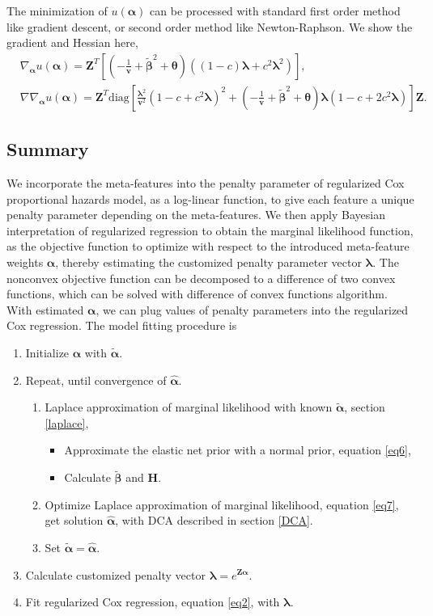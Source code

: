 \documentclass[12pt]{article}
\begin{document}
The minimization of $u(\bm{\alpha})$ can be processed with standard first order method like gradient descent, or second order method like Newton-Raphson. We show the gradient and Hessian here,
\begin{align*}
    &\nabla_{\bm{\alpha}} u(\bm{\alpha}) = \bm{Z}^T\left[(-\frac{1}{\bm{v}}+\widetilde{\bm{\beta}}^2+\bm{\theta})((1-c)\bm{\lambda}+c^2\bm{\lambda}^2)\right],\\
    &\nabla\nabla_{\bm{\alpha}} u(\bm{\alpha}) = \bm{Z}^T \text{diag}\left[\frac{\bm{\lambda}^2}{\bm{v}^2}(1-c+c^2\bm{\lambda})^2+(-\frac{1}{\bm{v}}+\widetilde{\bm{\beta}}^2+\bm{\theta})\bm{\lambda}(1-c+2c^2\bm{\lambda})\right]\bm{Z}.
\end{align*}

\subsection{Summary}
We incorporate the meta-features into the penalty parameter of regularized Cox proportional hazards model, as a log-linear function, to give each feature a unique penalty parameter depending on the meta-features. We then apply Bayesian interpretation of regularized regression to obtain the marginal likelihood function, as the objective function to optimize with respect to the introduced meta-feature weights $\bm{\alpha}$, thereby estimating the customized penalty parameter vector $\bm{\lambda}$. The nonconvex objective function can be decomposed to a difference of two convex functions, which can be solved with difference of convex functions algorithm. With estimated $\bm{\alpha}$, we can plug values of penalty parameters into the regularized Cox regression. The model fitting procedure is
\begin{enumerate}
    \item Initialize $\bm{\alpha}$ with $\widetilde{\bm{\alpha}}$.
    \item Repeat, until convergence of $\hat{\bm{\alpha}}$.
    \begin{enumerate}
        \item Laplace approximation of marginal likelihood with known $\widetilde{\bm{\alpha}}$, section \ref{laplace},
        \begin{itemize}
            \item Approximate the elastic net prior with a normal prior, equation \eqref{eq6},
            \item Calculate $\widetilde{\bm{\beta}}$ and $\bm{H}$.
        \end{itemize}
        \item Optimize Laplace approximation of marginal likelihood, equation \eqref{eq7}, get solution $\hat{\bm{\alpha}}$, with DCA described in section \ref{DCA}.
        \item Set $\widetilde{\bm{\alpha}} = \hat{\bm{\alpha}}$.
    \end{enumerate}
    \item Calculate customized penalty vector $\bm{\lambda}=e^{\bm{Z}\hat{\bm{\alpha}}}$.
    \item Fit regularized Cox regression, equation \eqref{eq2}, with $\bm{\lambda}$.
    
\end{enumerate}
\end{document}

